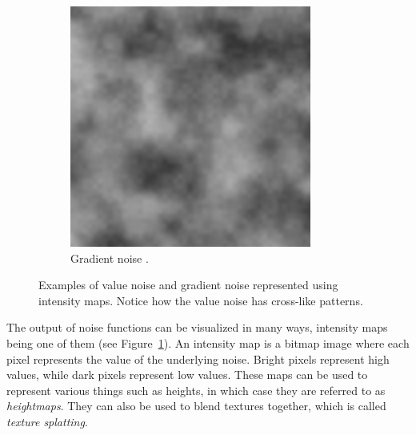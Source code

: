 \begin{figure}[h!]
\begin{subfigure}[b]{0.30\textwidth}
    \includegraphics[width=\textwidth]{figure/perlin_noise.png}
    \caption{Gradient noise \cite{perlin_noise_img}.}
  \end{subfigure}

  \caption{Examples of value noise and gradient noise represented using intensity maps. Notice how the value noise has cross-like patterns.}
  \label{fig:noisetypes}
\end{figure}

The output of noise functions can be visualized in many ways, intensity maps being one of them (see Figure~\ref{fig:noisetypes}).
An intensity map is a bitmap image where each pixel represents the value of the underlying noise.
Bright pixels represent high values, while dark pixels represent low values.
These maps can be used to represent various things such as heights, in which case they are referred to as \textit{heightmaps}.
They can also be used to blend textures together, which is called \textit{texture splatting}.